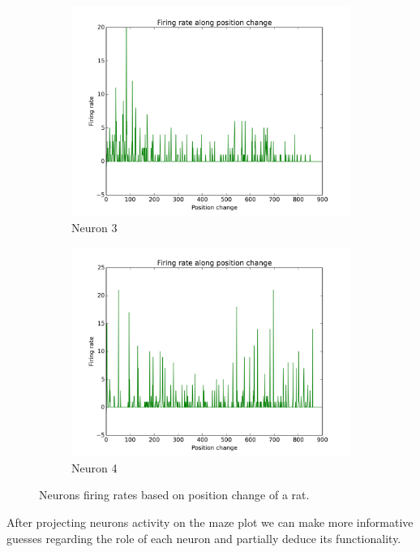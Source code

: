 \documentclass[12pt,a4paper,twocolumn]{article}
\begin{document}
\begin{figure}[htbp]
    \begin{subfigure}{.49\linewidth}\centering
    \includegraphics[width=1.1\textwidth]{figure3.png}
    \caption{Neuron 3\label{fig:FiringPosition_N3}}
  \end{subfigure}
  \begin{subfigure}{.49\linewidth}\centering
    \includegraphics[width=1.1\textwidth]{figure4.png}
    \caption{Neuron 4\label{fig:FiringPosition_N4}}
  \end{subfigure}

  \caption{Neurons firing rates based on position change of a rat.\label{fig:FiringPosition_ALL}}
\end{figure}

After projecting neurons activity on the maze plot we can make more informative guesses regarding the role of each neuron and partially deduce its functionality.\\
\end{document}
